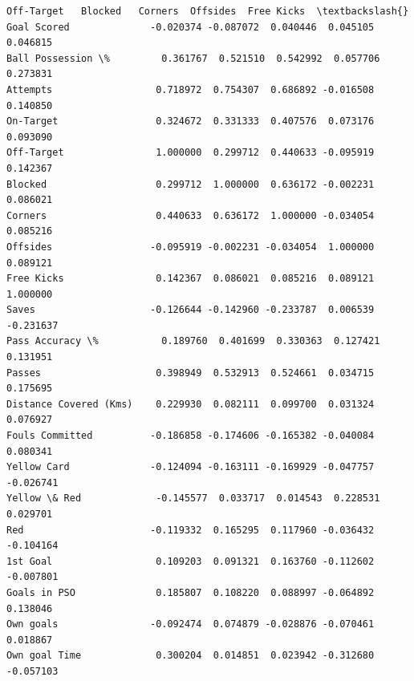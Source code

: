 \documentclass[11pt, a4paper]{report}
\begin{document}
\begin{tcolorbox}[breakable, size=fbox, boxrule=.5pt, pad at break*=1mm, opacityfill=0]
\begin{Verbatim}[commandchars=\\\{\}]
                        Off-Target   Blocked   Corners  Offsides  Free Kicks  \textbackslash{}
Goal Scored              -0.020374 -0.087072  0.040446  0.045105    0.046815
Ball Possession \%         0.361767  0.521510  0.542992  0.057706    0.273831
Attempts                  0.718972  0.754307  0.686892 -0.016508    0.140850
On-Target                 0.324672  0.331333  0.407576  0.073176    0.093090
Off-Target                1.000000  0.299712  0.440633 -0.095919    0.142367
Blocked                   0.299712  1.000000  0.636172 -0.002231    0.086021
Corners                   0.440633  0.636172  1.000000 -0.034054    0.085216
Offsides                 -0.095919 -0.002231 -0.034054  1.000000    0.089121
Free Kicks                0.142367  0.086021  0.085216  0.089121    1.000000
Saves                    -0.126644 -0.142960 -0.233787  0.006539   -0.231637
Pass Accuracy \%           0.189760  0.401699  0.330363  0.127421    0.131951
Passes                    0.398949  0.532913  0.524661  0.034715    0.175695
Distance Covered (Kms)    0.229930  0.082111  0.099700  0.031324    0.076927
Fouls Committed          -0.186858 -0.174606 -0.165382 -0.040084    0.080341
Yellow Card              -0.124094 -0.163111 -0.169929 -0.047757   -0.026741
Yellow \& Red             -0.145577  0.033717  0.014543  0.228531    0.029701
Red                      -0.119332  0.165295  0.117960 -0.036432   -0.104164
1st Goal                  0.109203  0.091321  0.163760 -0.112602   -0.007801
Goals in PSO              0.185807  0.108220  0.088997 -0.064892    0.138046
Own goals                -0.092474  0.074879 -0.028876 -0.070461    0.018867
Own goal Time             0.300204  0.014851  0.023942 -0.312680   -0.057103


\end{Verbatim}
\end{tcolorbox}
\end{document}
